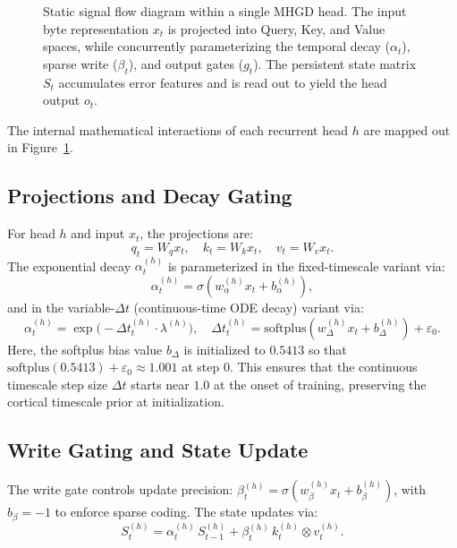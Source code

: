 \documentclass{article}
\newcommand{\eps}{\varepsilon}
\begin{document}
\begin{figure}[!ht]
\caption{Static signal flow diagram within a single MHGD head. The input byte representation $x_t$ is projected into Query, Key, and Value spaces, while concurrently parameterizing the temporal decay ($\alpha_t$), sparse write ($\beta_t$), and output gates ($g_t$). The persistent state matrix $S_t$ accumulates error features and is read out to yield the head output $o_t$.}
\label{fig:flowchart}
\end{figure}

The internal mathematical interactions of each recurrent head $h$ are mapped out in Figure~\ref{fig:flowchart}.

\subsection{Projections and Decay Gating}
\label{sec:projections}
For head $h$ and input $x_t$, the projections are:
\begin{equation}
  q_t = W_q x_t, \quad k_t = W_k x_t, \quad v_t = W_v x_t.
\end{equation}
The exponential decay $\alpha^{(h)}_t$ is parameterized in the fixed-timescale variant via:
\begin{equation}
  \alpha^{(h)}_t = \sigma\!\left(w_\alpha^{(h)} x_t + b_\alpha^{(h)}\right),
\end{equation}
and in the variable-$\Delta t$ (continuous-time ODE decay) variant via:
\begin{equation}
  \alpha^{(h)}_t = \exp\!\bigl(-\Delta t^{(h)}_t \cdot \lambda^{(h)}\bigr), \quad \Delta t^{(h)}_t = \mathrm{softplus}(w_\Delta^{(h)} x_t + b_\Delta^{(h)}) + \eps_0.
\end{equation}
Here, the softplus bias value $b_\Delta$ is initialized to $0.5413$ so that $\mathrm{softplus}(0.5413) + \eps_0 \approx 1.001$ at step 0. This ensures that the continuous timescale step size $\Delta t$ starts near $1.0$ at the onset of training, preserving the cortical timescale prior at initialization.

\subsection{Write Gating and State Update}
\label{sec:state-update}
The write gate controls update precision: $\beta^{(h)}_t = \sigma(w_\beta^{(h)} x_t + b_\beta^{(h)})$, with $b_\beta = -1$ to enforce sparse coding. The state updates via:
\begin{equation}
  S^{(h)}_t = \alpha^{(h)}_t\, S^{(h)}_{t-1} + \beta^{(h)}_t\, k^{(h)}_t \otimes v^{(h)}_t.
  \label{eq:state_update}
\end{equation}
\end{document}
